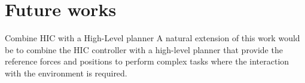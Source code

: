\section{Future works}

\begin{frame}{Combine HIC with a High-Level planner}
  A natural extension of this work would be to combine the HIC controller
  with a high-level planner that provide the reference forces and positions to
  perform complex tasks where the interaction with the environment is required.
    \begin{center}
    \end{center}
\end{frame}
